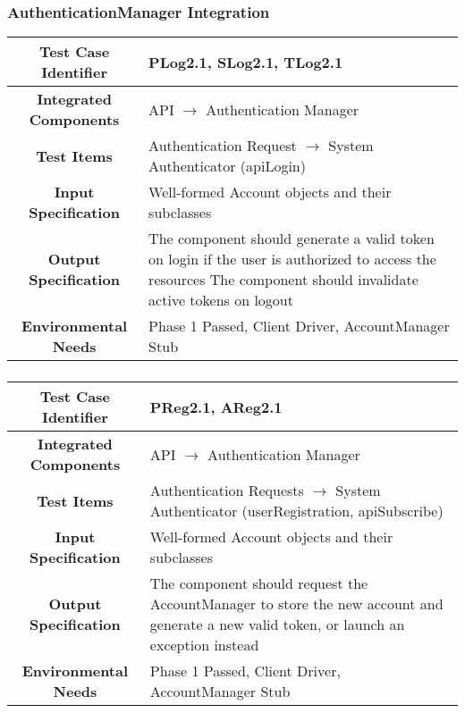 \documentclass[11pt, a4paper,titlepage]{article}
\begin{document}
	 \subsubsection{AuthenticationManager Integration}
	 \begin{tabularx}{\textwidth}{| c|X|}
	 	\hline \textbf{Test Case Identifier} & \label{PLog2.1}PLog2.1, \label{SLog2.1}SLog2.1, \label{TLog2.1}TLog2.1 \\
	 	\hline \textbf{Integrated Components} &  API $\rightarrow $ Authentication Manager\\
	 	\hline \textbf{Test Items} &  Authentication Request $\rightarrow $ System Authenticator (apiLogin)\\
	 	\hline \textbf{Input Specification} &  Well-formed Account objects and their subclasses\\
	 	\hline \textbf{Output Specification} & The component should generate a valid token on login if the user is authorized to access the resources \newline
	 	The component should invalidate active tokens on logout \\
	 	\hline \textbf{Environmental Needs} &  Phase 1 Passed, Client Driver, AccountManager Stub \\
	 	\hline
	 \end{tabularx}
	 \newline
	 \subsubsection{}
	 \begin{tabularx}{\textwidth}{| c|X|}
	 	\hline \textbf{Test Case Identifier} &  \label{PReg2.1}PReg2.1, \label{AReg2.1}AReg2.1 \\
	 	\hline \textbf{Integrated Components} & API $\rightarrow $ Authentication Manager \\
	 	\hline \textbf{Test Items} &  Authentication Requests $\rightarrow $ System Authenticator (userRegistration, apiSubscribe)\\
	 	\hline \textbf{Input Specification} & Well-formed Account objects and their subclasses  \\
	 	\hline \textbf{Output Specification} & The component should request the AccountManager to store the new account and generate a new valid token, or launch an exception instead \\
	 	\hline \textbf{Environmental Needs} & Phase 1 Passed, Client Driver, AccountManager Stub \\
	 	\hline
	 \end{tabularx}
	 \newline
\end{document}
